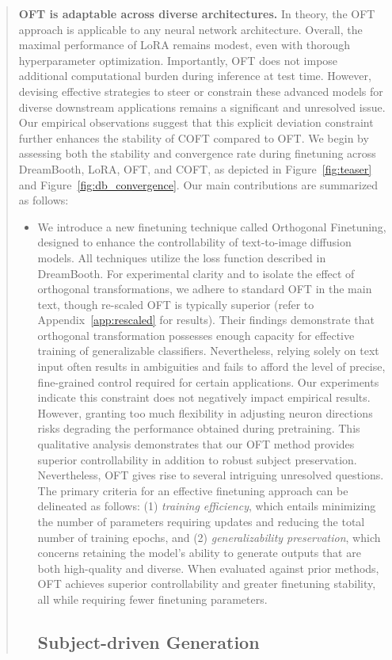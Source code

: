 \begin{abstract}
\textbf{OFT is adaptable across diverse architectures.} In theory, the OFT approach is applicable to any neural network architecture. Overall, the maximal performance of LoRA remains modest, even with thorough hyperparameter optimization. Importantly, OFT does not impose additional computational burden during inference at test time. However, devising effective strategies to steer or constrain these advanced models for diverse downstream applications remains a significant and unresolved issue. Our empirical observations suggest that this explicit deviation constraint further enhances the stability of COFT compared to OFT. We begin by assessing both the stability and convergence rate during finetuning across DreamBooth, LoRA, OFT, and COFT, as depicted in Figure~\ref{fig:teaser} and Figure~\ref{fig:db_convergence}. Our main contributions are summarized as follows:

\begin{itemize}[leftmargin=*,nosep]

    \item We introduce a new finetuning technique called Orthogonal Finetuning, designed to enhance the controllability of text-to-image diffusion models. All techniques utilize the loss function described in DreamBooth. For experimental clarity and to isolate the effect of orthogonal transformations, we adhere to standard OFT in the main text, though re-scaled OFT is typically superior (refer to Appendix~\ref{app:rescaled} for results). Their findings demonstrate that orthogonal transformation possesses enough capacity for effective training of generalizable classifiers. Nevertheless, relying solely on text input often results in ambiguities and fails to afford the level of precise, fine-grained control required for certain applications. Our experiments indicate this constraint does not negatively impact empirical results. However, granting too much flexibility in adjusting neuron directions risks degrading the performance obtained during pretraining. This qualitative analysis demonstrates that our OFT method provides superior controllability in addition to robust subject preservation. Nevertheless, OFT gives rise to several intriguing unresolved questions. The primary criteria for an effective finetuning approach can be delineated as follows: (1) \emph{training efficiency}, which entails minimizing the number of parameters requiring updates and reducing the total number of training epochs, and (2) \emph{generalizability preservation}, which concerns retaining the model’s ability to generate outputs that are both high-quality and diverse. When evaluated against prior methods, OFT achieves superior controllability and greater finetuning stability, all while requiring fewer finetuning parameters. \subsection{Subject-driven Generation}


\end{itemize}
\end{abstract}
